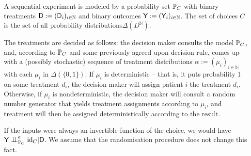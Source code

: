 

\begin{example}\label{ex:randomised_experiment}
A sequential experiment is modeled by a probability set $\mathbb{P}_C$ with binary treatments $\mathsf{D}:=(\mathsf{D}_i)_{i\in \mathbb{N}}$ and binary outcomes $\mathsf{Y}:=(\mathsf{Y}_i)_{i\in\mathbb{N}}$. The set of choices $C$ is the set of all probability distributions$\Delta(D^\mathbb{N})$.

The treatments are decided as follows: the decision maker consults the model $\mathbb{P}_C$, and, according to $\mathbb{P}_C$ and some previously agreed upon decision rule, comes up with a (possibly stochastic) sequence  of treatment distributions $\alpha:=(\mu_i)_{i\in \mathbb{N}}$ with each $\mu_i$ in $\Delta(\{0,1\})$. If $\mu_i$ is deterministic -- that is, it puts probability 1 on some treatment $d_i$, the decision maker will assign patient $i$ the treatment $d_i$. Otherwise, if $\mu_i$ is nondeterministic, the decision maker will consult a random number generator that yields treatment assignments according to $\mu_i$, and treatment will then be assigned deterministically according to the result.

If the inputs were always an invertible function of the choice, we would have $\RV{Y}\CI^e_{\prob{P}_C} \text{id}_C|\RV{D}$. We assume that the randomisation procedure does not change this fact.


\end{example}

